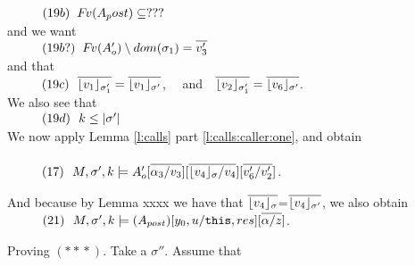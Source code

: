 \begin{description}
$\SPS (19b) \ \  \fv(A_post) \subseteq  ??? $
\\
and we want \\
$\SPS (19b?) \ \  \fv(\Ao') \setminus dom(\sigma_1)= \overline {v_3'}$
\\
and that
\\
$\SPS (19c) \ \ \overline {\interpret {\sigma_1'} {v_1} } = \overline {\interpret {\sigma'} {v_1} }$, \ \ and\ \  $\overline {\interpret {\sigma_1'}  {v_2} } = \overline {\interpret {\sigma'} {v_6} }$.
\\
We also see that \\
$\SPS (19d) \ \ k \leq \DepthSt {\sigma'}$
\\
We now apply Lemma \ref{l:calls} part \ref{l:calls:caller:one}, and obtain \\
\\
$\SPS (17) \ \  \satDAssertFrom M  {\sigma'} {k}   {\Ao'[\overline{\alpha_3/v_3}][\overline{\interpret {\sigma} {v_4} /v_4}][\overline {v_6'/ v_2'}]}$.

And because  by Lemma xxxx we have that $\overline{\interpret {\sigma} {v_4}}$=$\overline{\interpret {\sigma'} {v_4}}$, we also obtain
\\
$\SPS (21) \ \ \satDAssertFrom M  {\sigma'} {k}   {(A_{post})[y_0,u/\prg{this},res][\overline{\alpha/z}]}$.





 \vspace{.1cm}
Proving $(*\!*\!*)$. Take a $\sigma''$. Assume that\\
%



\end{description}
